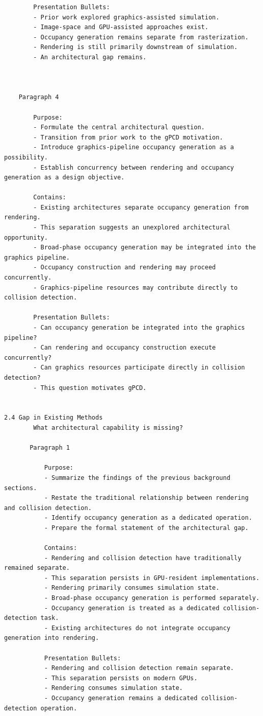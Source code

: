 \begin{verbatim}
		Presentation Bullets:
		- Prior work explored graphics-assisted simulation.
		- Image-space and GPU-assisted approaches exist.
		- Occupancy generation remains separate from rasterization.
		- Rendering is still primarily downstream of simulation.
		- An architectural gap remains.



	Paragraph 4

		Purpose:
		- Formulate the central architectural question.
		- Transition from prior work to the gPCD motivation.
		- Introduce graphics-pipeline occupancy generation as a possibility.
		- Establish concurrency between rendering and occupancy generation as a design objective.

		Contains:
		- Existing architectures separate occupancy generation from rendering.
		- This separation suggests an unexplored architectural opportunity.
		- Broad-phase occupancy generation may be integrated into the graphics pipeline.
		- Occupancy construction and rendering may proceed concurrently.
		- Graphics-pipeline resources may contribute directly to collision detection.

		Presentation Bullets:
		- Can occupancy generation be integrated into the graphics pipeline?
		- Can rendering and occupancy construction execute concurrently?
		- Can graphics resources participate directly in collision detection?
		- This question motivates gPCD.


2.4 Gap in Existing Methods
		What architectural capability is missing?

	   Paragraph 1

		   Purpose:
		   - Summarize the findings of the previous background sections.
		   - Restate the traditional relationship between rendering and collision detection.
		   - Identify occupancy generation as a dedicated operation.
		   - Prepare the formal statement of the architectural gap.

		   Contains:
		   - Rendering and collision detection have traditionally remained separate.
		   - This separation persists in GPU-resident implementations.
		   - Rendering primarily consumes simulation state.
		   - Broad-phase occupancy generation is performed separately.
		   - Occupancy generation is treated as a dedicated collision-detection task.
		   - Existing architectures do not integrate occupancy generation into rendering.

		   Presentation Bullets:
		   - Rendering and collision detection remain separate.
		   - This separation persists on modern GPUs.
		   - Rendering consumes simulation state.
		   - Occupancy generation remains a dedicated collision-detection operation.




\end{verbatim}
